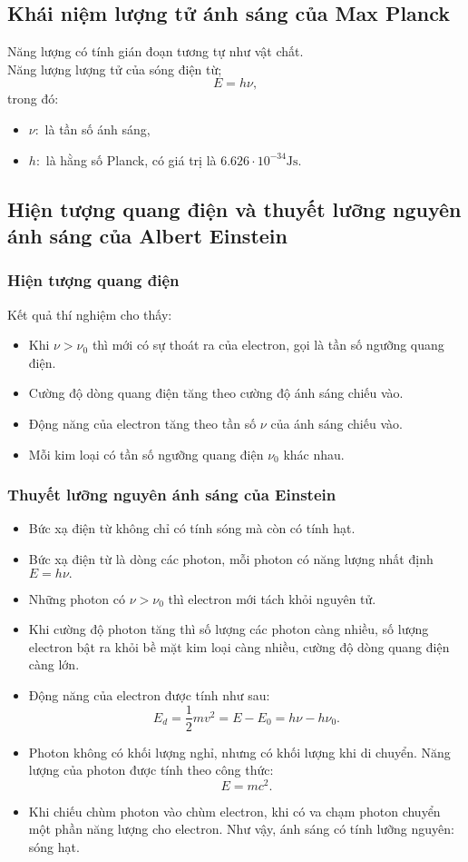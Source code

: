 \subsection{Khái niệm lượng tử ánh sáng của Max Planck}
Năng lượng có tính gián đoạn tương tự như vật chất.\\
Năng lượng lượng tử của sóng điện từ;
$$E = h \nu,$$ trong đó:
\begin{itemize}
\item $\nu:$ là tần số ánh sáng,
\item $h:$ là hằng số Planck, có giá trị là $6.626 \cdot 10^{- 34} \mathrm{Js}.$
\end{itemize}
\subsection{Hiện tượng quang điện và thuyết lưỡng nguyên ánh sáng của Albert Einstein}
\subsubsection{Hiện tượng quang điện}
Kết quả thí nghiệm cho thấy:
\begin{itemize}
\item Khi $\nu > \nu_0$ thì mới có sự thoát ra của electron, gọi là tần số ngưỡng quang điện.
\item Cường độ dòng quang điện tăng theo cường độ ánh sáng chiếu vào.
\item Động năng của electron tăng theo tần số $\nu$ của ánh sáng chiếu vào.
\item Mỗi kim loại có tần số ngưỡng quang điện $\nu_0$ khác nhau.
\end{itemize}
\subsubsection{Thuyết lưỡng nguyên ánh sáng của Einstein}
\begin{itemize}
\item Bức xạ điện từ không chỉ có tính sóng mà còn có tính hạt.
\item Bức xạ điện từ là dòng các photon, mỗi photon có năng lượng nhất định $E = h \nu.$
\item Những photon có $\nu > \nu_0$ thì electron mới tách khỏi nguyên tử.
\item Khi cường độ photon tăng thì số lượng các photon càng nhiều, số lượng electron bật ra khỏi bề mặt kim loại càng nhiều, cường độ dòng quang điện càng lớn.
\item Động năng của electron được tính như sau:
$$E_{d} = \frac{1}{2}mv^2 = E - E_0 = h \nu - h \nu_0.$$
\item Photon không có khối lượng nghỉ, nhưng có khối lượng khi di chuyển. Năng lượng của photon được tính theo công thức:
$$E = mc^2.$$
\item Khi chiếu chùm photon vào chùm electron, khi có va chạm photon chuyển một phần năng lượng cho electron. Như vậy, ánh sáng có tính lưỡng nguyên: sóng hạt.
\end{itemize}
